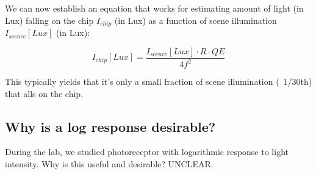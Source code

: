 We can now establish an equation that works for estimating amount of light (in Lux) falling on the chip $I_{chip}$ (in Lux) as a function of scene illumination $I_{scence}[Lux]$ (in Lux):

\begin{equation}
    I_{chip}[Lux] = \frac{I_{scence}[Lux]\cdot R \cdot QE}{4f^2}
\end{equation}

This typically yields that it's only a small fraction of scene illumination (~1/30th) that alls on the chip. 

\subsection{Why is a log response desirable?}

During the lab, we studied photoreceptor with logarithmic response to light intensity. Why is this useful and desirable? UNCLEAR.